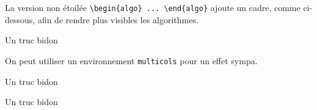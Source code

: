 La version non étoilée \verb+\begin{algo} ... \end{algo}+ ajoute un cadre, comme ci-dessous, afin de rendre plus visibles les algorithmes.


\begin{algo}
    \caption{Un truc bidon}

\end{algo} 


\medskip


On peut utiliser un environnement \verb+multicols+ pour un effet sympa.


\begin{multicols}{2}    
\begin{algo}
    \caption{Un truc bidon}

\end{algo} 
\begin{algo}
    \caption{Un truc bidon}

\end{algo}
\end{multicols}


